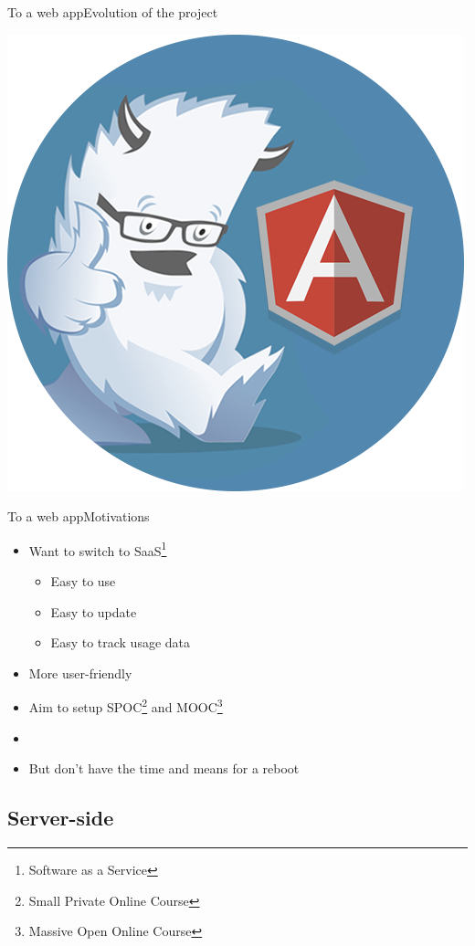 \documentclass{beamer}
\begin{document}
\begin{frame}{To a web app}{Evolution of the project}
\begin{center}
    \includegraphics[scale=0.1]{img/foundation-angular.png}
  \end{center}
\end{frame}

\begin{frame}{To a web app}{Motivations}
  \begin{itemize}
  \item {
    Want to switch to SaaS\footnote{Software as a Service}
    \begin{itemize}
    \item Easy to use
    \item Easy to update
    \item Easy to track usage data
    \end{itemize}
  }
  \item {
    More user-friendly
  }
  \item {
    Aim to setup SPOC\footnote{Small Private Online Course} and MOOC\footnote{Massive Open Online Course}
  }
  \item[~]
  \item {
    But don't have the time and means for a reboot
  }
  \end{itemize}
\end{frame}

\subsection{Server-side}
\end{document}
